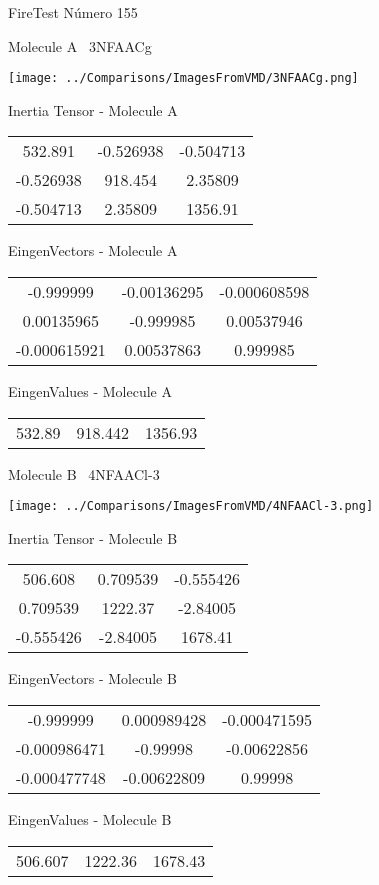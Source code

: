 \vtab[-3cm]
\begin{center}
{\large FireTest \tab Número 155}
\end{center}
\begin{multicols}{2}
\begin{center}

Molecule A \
3NFAACg

\texttt{[image: ../Comparisons/ImagesFromVMD/3NFAACg.png]}

Inertia Tensor - Molecule A \\
\begin{tabular}{|c c c|}
532.891	 & 	-0.526938	 & 	-0.504713	 \\
-0.526938	 & 	918.454	 & 	2.35809	 \\
-0.504713	 & 	2.35809	 & 	1356.91
\end{tabular}

\vtab
 EingenVectors - Molecule A     \\
\begin{tabular}{|c c c|}
-0.999999	 & 	-0.00136295	 & 	-0.000608598	 \\
0.00135965	 & 	-0.999985	 & 	0.00537946	 \\
-0.000615921	 & 	0.00537863	 & 	0.999985
\end{tabular}

\vtab
 EingenValues - Molecule A     \\
\begin{tabular}{|c c c|}
532.89	 & 	918.442	 & 	1356.93	 \\
\end{tabular}
\columnbreak

Molecule B \
4NFAACl-3

\texttt{[image: ../Comparisons/ImagesFromVMD/4NFAACl-3.png]}

Inertia Tensor - Molecule B \\
\begin{tabular}{|c c c|}
506.608	 & 	0.709539	 & 	-0.555426	 \\
0.709539	 & 	1222.37	 & 	-2.84005	 \\
-0.555426	 & 	-2.84005	 & 	1678.41
\end{tabular}

\vtab
 EingenVectors - Molecule B     \\
\begin{tabular}{|c c c|}
-0.999999	 & 	0.000989428	 & 	-0.000471595	 \\
-0.000986471	 & 	-0.99998	 & 	-0.00622856	 \\
-0.000477748	 & 	-0.00622809	 & 	0.99998
\end{tabular}

\vtab
 EingenValues - Molecule B     \\
\begin{tabular}{|c c c|}
506.607	 & 	1222.36	 & 	1678.43	 \\
\end{tabular}

\end{center}
\end{multicols}

